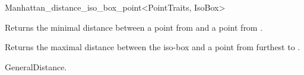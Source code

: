 \begin{ccRefClass}{Manhattan_distance_iso_box_point<PointTraits, IsoBox>}

{Returns the minimal distance between a point from  and a point from
.}

{Returns the maximal distance between the iso-box  and
a point from  furthest to .}


\ccSeeAlso

GeneralDistance.




\end{ccRefClass}


